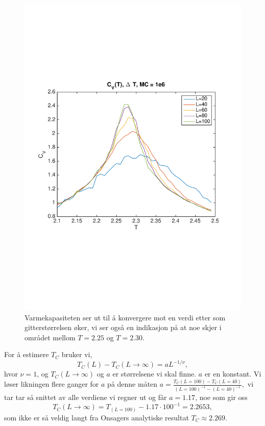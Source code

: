 \documentclass[norsk, 10pt]{article}
\begin{document}
\begin{figure}[H]
	\centering
	\includegraphics[scale = 0.6, trim = 1cm 8cm 1cm 8cm]{cv_difftemp.pdf}
	\caption{Varmekapasiteten ser ut til å konvergere mot en verdi etter som gitterstørrelsen øker, vi ser også en indikasjon på at noe skjer i området mellom $T=2.25$ og $T = 2.30$.}
	\label{fig:cv_difftemp}
\end{figure}

For å estimere $T_C$ bruker vi,
$$ T_C(L) - T_C(L\to\infty) = aL^{-1/\nu}, $$
hvor $\nu=1$, og $T_C(L\to\infty)$ og $a$ er størrelsene vi skal finne. $a$ er en konstant. Vi løser likningen flere ganger for $a$ på denne måten
$ a = \frac{T_C(L=100) - T_C(L=40)}{(L=100)^{-1} - (L=40)^{-1}}, $
vi tar tar så snittet av alle verdiene vi regner ut og får
$a=1.17$, noe som gir oss
$$ T_C(L\to\infty) = T_(L=100) - 1.17\cdot100^{-1} = 2.2653, $$
som ikke er så veldig langt fra Onsagers analytiske resultat $T_C \approx 2.269$.
\end{document}
